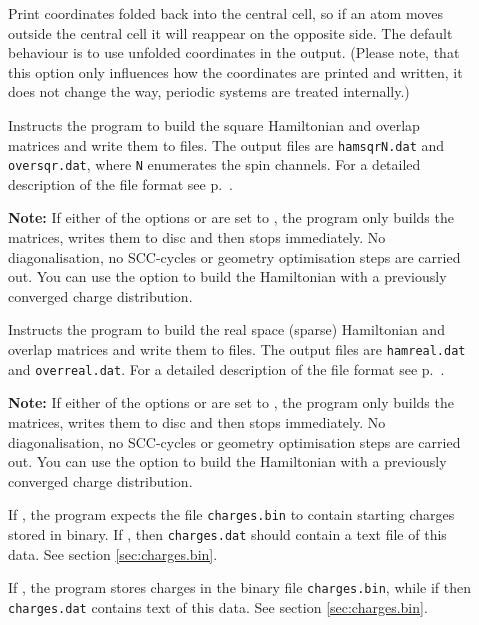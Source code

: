 \begin{description}
\item[] Print coordinates folded back into the
  central cell, so if an atom moves outside the central cell it will
  reappear on the opposite side. The default behaviour is to use
  unfolded coordinates in the output. (Please note, that this option
  only influences how the coordinates are printed and written, it does
  not change the way, periodic systems are treated internally.)

\item[] Instructs the program to build the square
  Hamiltonian and overlap matrices and write them to files. The output
  files are \verb|hamsqrN.dat| and \verb|oversqr.dat|, where \verb|N|
  enumerates the spin channels. For a detailed description of the file
  format see p.~.

  \textbf{Note:} If either of the options  or  are
  set to , the program only builds the matrices, writes them to disc and
  then stops immediately. No diagonalisation, no SCC-cycles or geometry
  optimisation steps are carried out. You can use the 
  option to build the Hamiltonian with a previously converged charge
  distribution.

\item[] Instructs the program to build the real space
  (sparse) Hamiltonian and overlap matrices and write them to
  files. The output files are \verb|hamreal.dat| and
  \verb|overreal.dat|. For a detailed description of the file format
  see p.~.

  \textbf{Note:} If either of the options  or  are
  set to , the program only builds the matrices, writes them to disc and
  then stops immediately. No diagonalisation, no SCC-cycles or geometry
  optimisation steps are carried out. You can use the 
  option to build the Hamiltonian with a previously converged charge
  distribution.

\item[] If , the program expects the file
  \verb|charges.bin| to contain starting charges stored in binary. If ,
  then \verb|charges.dat| should contain a text file of this data. See section
  \ref{sec:charges.bin}.

\item[] If , the program stores charges in the
  binary file \verb|charges.bin|, while if  then \verb|charges.dat|
  contains text of this data. See section \ref{sec:charges.bin}.

\end{description}


